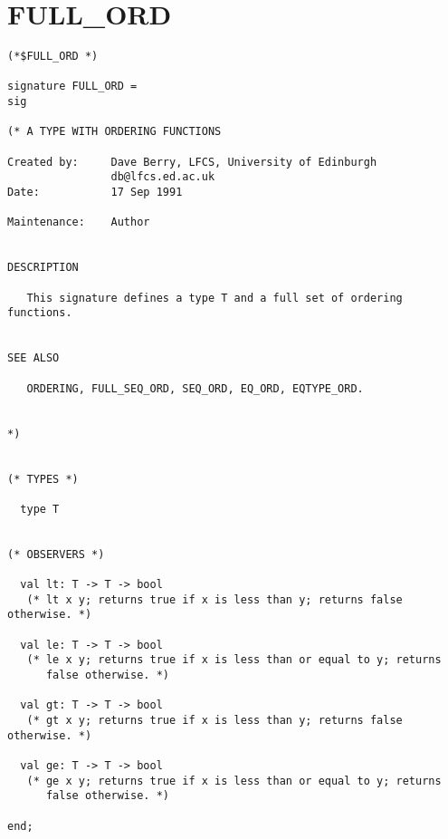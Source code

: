 \section{FULL\_ORD}
\begin{verbatim}
(*$FULL_ORD *)

signature FULL_ORD =
sig

(* A TYPE WITH ORDERING FUNCTIONS

Created by:     Dave Berry, LFCS, University of Edinburgh
                db@lfcs.ed.ac.uk
Date:           17 Sep 1991

Maintenance:    Author


DESCRIPTION

   This signature defines a type T and a full set of ordering functions.


SEE ALSO

   ORDERING, FULL_SEQ_ORD, SEQ_ORD, EQ_ORD, EQTYPE_ORD.


*)


(* TYPES *)

  type T


(* OBSERVERS *)

  val lt: T -> T -> bool
   (* lt x y; returns true if x is less than y; returns false otherwise. *)

  val le: T -> T -> bool
   (* le x y; returns true if x is less than or equal to y; returns
      false otherwise. *)

  val gt: T -> T -> bool
   (* gt x y; returns true if x is less than y; returns false otherwise. *)

  val ge: T -> T -> bool
   (* ge x y; returns true if x is less than or equal to y; returns
      false otherwise. *)

end;
\end{verbatim}


\newpage
